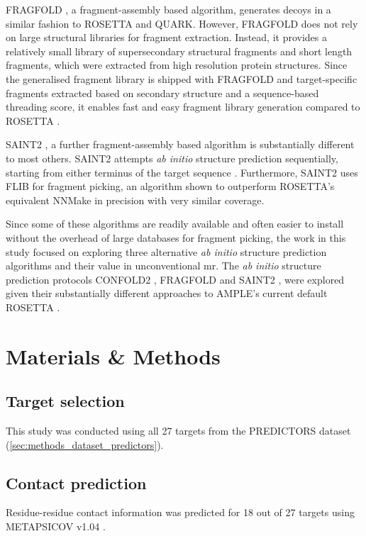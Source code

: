 FRAGFOLD \cite{Jones2001-mc}, a fragment-assembly based algorithm, generates decoys in a similar fashion to ROSETTA and QUARK. However, FRAGFOLD does not rely on large structural libraries for fragment extraction. Instead, it provides a relatively small library of supersecondary structural fragments and short length fragments, which were extracted from high resolution protein structures. Since the generalised fragment library is shipped with FRAGFOLD and target-specific fragments extracted based on secondary structure and a sequence-based threading score, it enables fast and easy fragment library generation compared to ROSETTA \cite{Kosciolek2014-bt}.

SAINT2 \cite{De_Oliveira2017-sg}, a further fragment-assembly based algorithm is substantially different to most others. SAINT2 attempts \textit{ab initio} structure prediction sequentially, starting from either terminus of the target sequence \cite{De_Oliveira2017-sg}. Furthermore, SAINT2 uses FLIB \cite{De_Oliveira2015-kb} for fragment picking, an algorithm shown to outperform ROSETTA's equivalent NNMake \cite{Gront2011-sv} in precision with very similar coverage.

Since some of these algorithms are readily available and often easier to install without the overhead of large databases for fragment picking, the work in this study focused on exploring three alternative \textit{ab initio} structure prediction algorithms and their value in unconventional \gls{mr}. The \textit{ab initio} structure prediction protocols CONFOLD2 \cite{Adhikari2018-lj}, FRAGFOLD \cite{Jones2001-mc} and SAINT2 \cite{De_Oliveira2017-sg}, were explored given their substantially different approaches to AMPLE's current default ROSETTA \cite{Rohl2004-dj}.

\section{Materials \& Methods}
\subsection{Target selection}
This study was conducted using all 27 targets from the PREDICTORS dataset (\cref{sec:methods_dataset_predictors}).

\subsection{Contact prediction}
Residue-residue contact information was predicted for 18 out of 27 targets using METAPSICOV v1.04 \cite{Jones2015-vq}.

